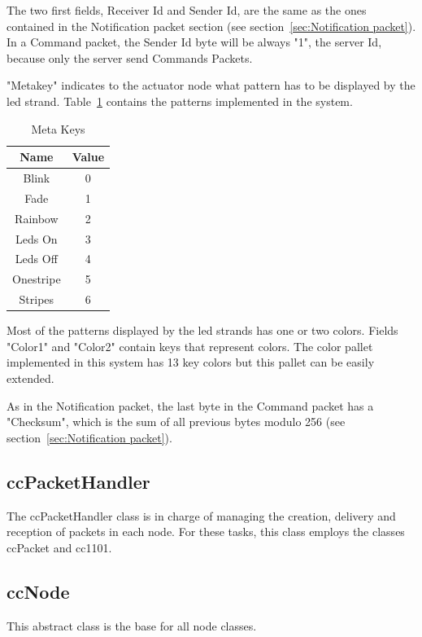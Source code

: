 The two first fields, Receiver Id and Sender Id, are the same as the ones contained in the Notification packet section (see section~\ref{sec:Notification packet}). In a Command packet, the Sender Id byte will be always "1", the server Id, because only the server send Commands Packets.

"Metakey" indicates to the actuator node what pattern has to be displayed by the led strand. Table~\ref{Meta Keys} contains the patterns implemented in the system.

\begin{table}[h]
  \centering
  \begin{tabular}{ c | c }
    \hline
    \textbf{Name} & \textbf{Value}\\ [0.5ex]    
    \hline
    Blink & 0 \\
    Fade & 1 \\
    Rainbow & 2\\
    Leds On & 3\\
    Leds Off & 4\\ 
    Onestripe & 5\\
    Stripes & 6 \\
    \hline
  \end{tabular}
  \caption[Meta Keys]%
          {Meta Keys}
  \label{Meta Keys}
\end{table}

Most of the patterns displayed by the led strands has one or two colors. Fields "Color1" and "Color2" contain   keys that represent colors. The color pallet implemented in this system has 13 key colors but this pallet can be easily extended. 

As in the Notification packet, the last byte in the Command packet has a "Checksum", which is the sum of all previous bytes modulo 256 (see section~\ref{sec:Notification packet}). 

\subsection{ccPacketHandler}

The ccPacketHandler class is in charge of managing the creation, delivery and reception of packets in each node. For these tasks, this class employs the classes ccPacket and cc1101. 

\subsection{ccNode}
This abstract class is the base for all node classes.  
